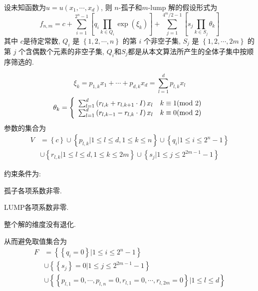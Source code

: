 \documentclass{article}
\newcommand{\sbrace}[1]{\left(#1\right)}
\newcommand{\mbrace}[1]{\left[#1\right]}
\newcommand{\bbrace}[1]{\left\{#1\right\}}
\begin{document}
设未知函数为$u=u(x_1,\cdots,x_d)$, 则 $n$-孤子和$m$-lump 解的假设形式为
\begin{equation}
    f_{n,m}=c+\sum_{i=1}^{2^n-1}\mbrace{q_i\prod_{k\in Q_i}{\exp(\xi_k)}}+\sum_{j=1}^{4^m/2-1}\mbrace{s_j\prod_{k \in S_j}{\theta_k}}
\end{equation}
其中 $c$是待定常数, $Q_i$ 是 $\bbrace{1,2,\cdots,n}$ 的第 $i$ 个非空子集, $S_j$ 是 $\bbrace{1,2,\cdots,2m}$ 的第 $j$ 个含偶数个元素的非空子集, $Q_i$和$S_j$都是从本文算法所产生的全体子集中按顺序筛选的. 

\begin{equation}
    \xi_k=p_{1,k}x_1+\cdots+p_{d,k}x_d=\sum_{l=1}^d{p_{l,k}x_l}
\end{equation}
\begin{equation}
    \theta_k=\left\{\begin{array}{ll}
        \sum_{l=1}^d{\sbrace{r_{l,k}+r_{l,k+1}\cdot I}x_l} & k \equiv 1 ({\rm mod~} 2)   \\ 
        \sum_{l=1}^d{\sbrace{r_{l,k-1}-r_{l,k}\cdot I}x_l} & k \equiv 0 ({\rm mod~} 2) \\ 
    \end{array}\right.
\end{equation}
参数的集合为
\begin{equation}
\begin{split}
V&=\bbrace{c}\cup\bbrace{p_{l,k}|1\le l\le d, 1\le k \le n}\cup \bbrace{q_i|1\le i \le 2^n-1}\\
 &\cup\bbrace{r_{l,k}|1\le l \le d,1\le k \le 2m}\cup\bbrace{s_j|1\le j \le 2^{2m-1}-1}
\end{split}
\end{equation}

约束条件为:
\begin{compactitem}[\textbullet]
\item 孤子各项系数非零.
\item LUMP各项系数非零.
\item 整个解的维度没有退化.
\end{compactitem}

从而避免取值集合为
\begin{equation}
\begin{split}
F&=\bbrace{\bbrace{q_i=0}|1\le i \le 2^n-1} \\
&\cup\bbrace{\bbrace{s_j}=0|1\le j \le 2^{2m-1}-1} \\
&\cup\bbrace{\bbrace{p_{l,1}=0,\cdots,p_{l,n}=0,r_{l,1}=0,\cdots,r_{l,2m}=0}|1\le l \le d}
\end{split}
\end{equation}
\end{document}
